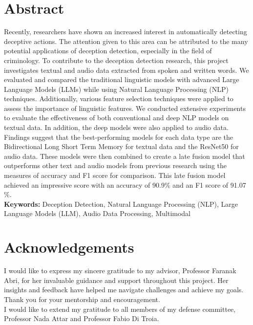 \documentclass[12pt]{article}
\begin{document}

\doublespacing
\section*{Abstract}
\bigskip
Recently, researchers have shown an increased interest in automatically detecting deceptive actions. The attention given to this area can be attributed to the many potential applications of deception detection, especially in the field of criminology. To contribute to the deception detection research, this project investigates textual and audio data extracted from spoken and written words. We evaluated and compared the traditional linguistic models with advanced Large Language Models (LLMs) while using Natural Language Processing (NLP) techniques. Additionally, various feature selection techniques were applied to assess the importance of linguistic features. We conducted extensive experiments to evaluate the effectiveness of both conventional and deep NLP models on textual data. In addition, the deep models were also applied to audio data. Findings suggest that the best-performing models for each data type are the Bidirectional Long Short Term Memory for textual data and the ResNet50 for audio data. These models were then combined to create a late fusion model that outperforms other text and audio models from previous research using the measures of accuracy and F1 score for comparison. This late fusion model achieved an impressive score with an accuracy of 90.9$\%$ and an F1 score of 91.07$\%$.\\

\noindent \textbf{Keywords:} Deception Detection, Natural Language Processing (NLP), Large Language Models (LLM), Audio Data Processing, Multimodal
\newpage
\section*{Acknowledgements}
I would like to express my sincere gratitude to my advisor, Professor Faranak Abri, for her invaluable guidance and support throughout this project. Her insights and feedback have helped me navigate challenges and achieve my goals. Thank you for your mentorship and encouragement.\\
  
\noindent
I would like to extend my gratitude to all members of my defense committee, Professor Nada Attar and Professor Fabio Di Troia.\\
\end{document}
